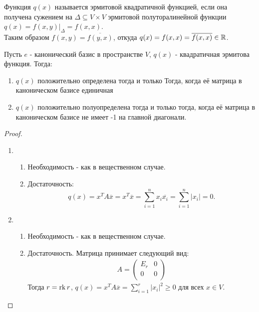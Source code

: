 
\begin{reminder}
    Функция $q(x)$ называется эрмитовой квадратичной функцией, если она получена сужением на $\Delta \subseteq V \times V$
    эрмитовой полуторалинейной функции $q(x) = f(x, y) \vert_{\Delta} = f(x, x)$. \\
    Таким образом $f(x, y) = \overline{f(y, x)}$, откуда $q(x) = f(x, x) = \overline{f(x, x)} \in \mathbb{R}$.
\end{reminder}

\begin{proposition}
    Пусть $e$ - канонический базис в пространстве $V$, $q(x)$ - квадратичная эрмитова функция. 
    Тогда:
    \begin{enumerate}
        \item $q(x)$ положительно определена тогда и только Тогда, когда её матрица в каноническом 
        базисе единичная
        \item $q(x)$ положительно полуопределена тогда и только тогда, когда её матрица в 
        каноническом базисе не имеет -1 на главной диагонали.
    \end{enumerate}
\end{proposition}

\begin{proof}~
    \begin{enumerate}
        \item \begin{enumerate}
            \item Необходимость - как в вещественном случае.
            \item Достаточность: $$q(x) = x^T A \overline{x} = x^T \overline{x} = \sum_{i=1}^{n} x_i \overline{x_i} 
            = \sum_{i=1}^{n} |x_i| = 0.$$
        \end{enumerate}
        \item \begin{enumerate}
            \item Необходимость - как в вещественном случае.
            \item Достаточность. Матрица принимает следующий вид:
            \begin{gather*}
                A = \begin{pmatrix}
                E_r    & 0      \\
                0      & 0      \\
                \end{pmatrix}
            \end{gather*}
            Тогда $r = \operatorname{rk} r$, $q(x) = x^T A \overline{x} = \sum_{i=1}^{r} |x_i|^2 \geq 0$ для всех $x \in V$.
        \end{enumerate}
    \end{enumerate}
\end{proof}

